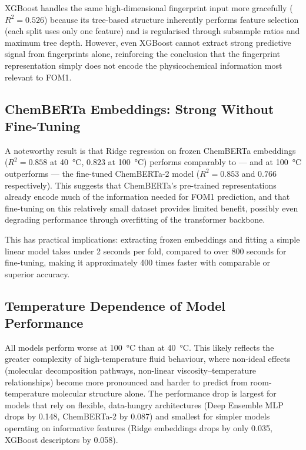 \documentclass[11pt,a4paper]{article}
\begin{document}
XGBoost handles the same high-dimensional fingerprint input more gracefully ($R^2 = 0.526$) because its tree-based structure inherently performs feature selection (each split uses only one feature) and is regularised through subsample ratios and maximum tree depth. However, even XGBoost cannot extract strong predictive signal from fingerprints alone, reinforcing the conclusion that the fingerprint representation simply does not encode the physicochemical information most relevant to FOM1.

\subsection{ChemBERTa Embeddings: Strong Without Fine-Tuning}

A noteworthy result is that Ridge regression on frozen ChemBERTa embeddings ($R^2 = 0.858$ at \SI{40}{\degreeCelsius}, $0.823$ at \SI{100}{\degreeCelsius}) performs comparably to --- and at \SI{100}{\degreeCelsius} outperforms --- the fine-tuned ChemBERTa-2 model ($R^2 = 0.853$ and $0.766$ respectively). This suggests that ChemBERTa's pre-trained representations already encode much of the information needed for FOM1 prediction, and that fine-tuning on this relatively small dataset provides limited benefit, possibly even degrading performance through overfitting of the transformer backbone.

This has practical implications: extracting frozen embeddings and fitting a simple linear model takes under 2 seconds per fold, compared to over 800 seconds for fine-tuning, making it approximately 400 times faster with comparable or superior accuracy.

\subsection{Temperature Dependence of Model Performance}

All models perform worse at \SI{100}{\degreeCelsius} than at \SI{40}{\degreeCelsius}. This likely reflects the greater complexity of high-temperature fluid behaviour, where non-ideal effects (molecular decomposition pathways, non-linear viscosity--temperature relationships) become more pronounced and harder to predict from room-temperature molecular structure alone. The performance drop is largest for models that rely on flexible, data-hungry architectures (Deep Ensemble MLP drops by 0.148, ChemBERTa-2 by 0.087) and smallest for simpler models operating on informative features (Ridge embeddings drops by only 0.035, XGBoost descriptors by 0.058).
\end{document}

